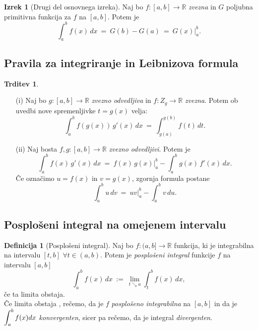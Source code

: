 \documentclass[11pt]{article}
\theoremstyle{definition}
\newtheorem{definicija}{Definicija}[section]
\theoremstyle{definition}
\newtheorem{trditev}{Trditev}[section]
\theoremstyle{definition}
\newtheorem{izrek}{Izrek}[section]
\theoremstyle{theorem}
\begin{document}
\begin{izrek}[Drugi del osnovnega izreka]

Naj bo $f:[a, b] \rightarrow \mathbb{R}$ \textit{zvezna} in $G$ poljubna primitivna funkcija za $f$ na $[a, b]$. Potem je
$$\int_a^b f(x)\,dx ~=~ G(b) - G(a) ~=~ G(x) \Big|_a^b.$$

\end{izrek}
\vspace{0.5cm}


\subsection{Pravila za integriranje in Leibnizova formula}
\vspace{0.5cm}

\begin{trditev}
~
\begin{enumerate}

	\item[(i)] Naj bo $g:[a, b] \rightarrow \mathbb{R}$ \textit{zvezno odvedljiva} in $f: Z_g \rightarrow \mathbb{R}$ \textit{zvezna}. Potem ob uvedbi nove spremenljivke $t = g(x)$ velja:
	$$\int_a^b f(g(x))\,g'(x)\,dx ~=~ \int_{g(a)}^{g(b)} f(t)\,dt.$$
	
	\item[(ii)] Naj bosta $f,g:[a, b] \rightarrow \mathbb{R}$ \textit{zvezno odvedljivi}. Potem je
	$$\int_a^b f(x)\,g'(x)\,dx ~=~ f(x)\,g(x) \Big|_a^b - \int_a^b g(x)\,f'(x)\,dx.$$
	Če označimo $u = f(x)$ in $v = g(x)$, zgornja formula postane
	$$\int_a^b u\,dv ~=~ uv \Big|_a^b - \int_a^b v\,du.$$
	
\end{enumerate}
\end{trditev}
\vspace{0.5cm}


\subsection{Posplošeni integral na omejenem intervalu}
\vspace{0.5cm}

\begin{definicija}[Posplošeni integral]

Naj bo $f:(a, b] \rightarrow \mathbb{R}$ funkcija, ki je integrabilna na intervalu $[t, b]$ $\forall t \in (a, b)$. Potem je \textit{posplošeni integral} funkcije $f$ na intervalu $[a, b]$
$$\int_{a}^{b} f(x)\,dx ~:=~ \lim_{t \searrow a} \int_{t}^{b} f(x)\,dx,$$
če ta limita obstaja. \\

\noindent Če limita obstaja , rečemo, da je $f$ \textit{posplošeno integrabilna} na $[a, b]$ in da je $\mathlarger{\int_{a}^{b} f(x) dx}$ \textit{konvergenten}, sicer pa rečemo, da je integral \textit{divergenten}.

\end{definicija}
\vspace{0.5cm}
\end{document}
